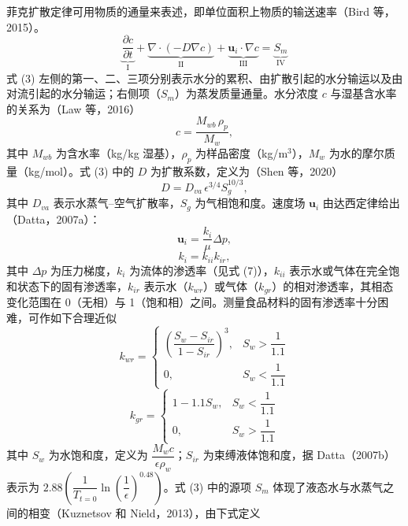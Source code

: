 \documentclass[11pt,a4paper]{ctexart}
\begin{document}
菲克扩散定律可用物质的通量来表述，即单位面积上物质的输送速率（Bird 等，2015）。
\begin{equation}
\underbrace{\frac{\partial c}{\partial t}}_{\text{I}} + \underbrace{\nabla\cdot(-D\nabla c)}_{\text{II}} + \underbrace{\bm{u}_i\cdot\nabla c}_{\text{III}} = \underbrace{S_m}_{\text{IV}}
\end{equation}
式 (3) 左侧的第一、二、三项分别表示水分的累积、由扩散引起的水分输运以及由对流引起的水分输运；右侧项（$S_m$）为蒸发质量通量。水分浓度 $c$ 与湿基含水率的关系为（Law 等，2016）
\begin{equation}
c = \frac{M_{wb}\,\rho_p}{M_w},
\end{equation}
其中 $M_{wb}$ 为含水率（kg/kg 湿基），$\rho_p$ 为样品密度（kg/m$^3$），$M_w$ 为水的摩尔质量（kg/mol）。式 (3) 中的 $D$ 为扩散系数，定义为（Shen 等，2020）
\begin{equation}
D = D_{va}\,\epsilon^{3/4} S_g^{10/3},
\end{equation}
其中 $D_{va}$ 表示水蒸气--空气扩散率，$S_g$ 为气相饱和度。速度场 $\bm{u}_i$ 由达西定律给出（Datta，2007a）：
\begin{equation}
\bm{u}_i = \frac{k_i}{\mu}\Delta p,
\end{equation}
\begin{equation}
k_i = k_{ii}k_{ir},
\end{equation}
其中 $\Delta p$ 为压力梯度，$k_i$ 为流体的渗透率（见式 (7)），$k_{ii}$ 表示水或气体在完全饱和状态下的固有渗透率，$k_{ir}$ 表示水（$k_{wr}$）或气体（$k_{gr}$）的相对渗透率，其相态变化范围在 0（无相）与 1（饱和相）之间。测量食品材料的固有渗透率十分困难，可作如下合理近似
\begin{equation}
k_{wr} =
\begin{cases}
\left(\dfrac{S_w - S_{ir}}{1 - S_{ir}}\right)^3, & S_w > \dfrac{1}{1.1}\\[8pt]
0, & S_w < \dfrac{1}{1.1}
\end{cases}
\end{equation}
\begin{equation}
k_{gr} =
\begin{cases}
1 - 1.1 S_w, & S_w < \dfrac{1}{1.1}\\[6pt]
0, & S_w > \dfrac{1}{1.1}
\end{cases}
\end{equation}
其中 $S_w$ 为水饱和度，定义为 $\dfrac{M_w c}{\epsilon \rho_w}$；$S_{ir}$ 为束缚液体饱和度，据 Datta（2007b）表示为 $2.88\left(\dfrac{1}{T_{t=0}}\ln\left(\dfrac{1}{\epsilon}\right)^{0.48}\right)$。式 (3) 中的源项 $S_m$ 体现了液态水与水蒸气之间的相变（Kuznetsov 和 Nield，2013），由下式定义
\end{document}
